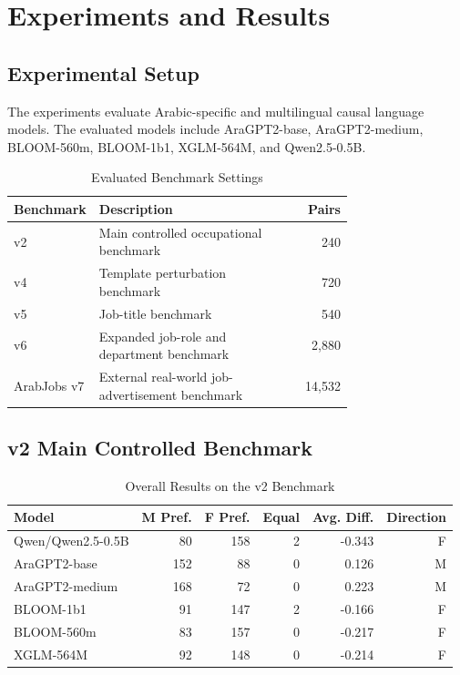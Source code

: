 \documentclass[conference]{IEEEtran}
\begin{document}
\section{Experiments and Results}

\subsection{Experimental Setup}

The experiments evaluate Arabic-specific and multilingual causal language models. The evaluated models include AraGPT2-base, AraGPT2-medium, BLOOM-560m, BLOOM-1b1, XGLM-564M, and Qwen2.5-0.5B.

\begin{table}[htbp]
\caption{Evaluated Benchmark Settings}
\begin{center}
\begin{tabular}{p{0.16\linewidth}p{0.58\linewidth}r}
\toprule
Benchmark & Description & Pairs \\
\midrule
v2 & Main controlled occupational benchmark & 240 \\
v4 & Template perturbation benchmark & 720 \\
v5 & Job-title benchmark & 540 \\
v6 & Expanded job-role and department benchmark & 2,880 \\
ArabJobs v7 & External real-world job-advertisement benchmark & 14,532 \\
\bottomrule
\end{tabular}
\label{tab:benchmarks}
\end{center}
\end{table}

\subsection{v2 Main Controlled Benchmark}

\begin{table}[htbp]
\caption{Overall Results on the v2 Benchmark}
\begin{center}
\begin{tabular}{lrrrrr}
\toprule
Model & M Pref. & F Pref. & Equal & Avg. Diff. & Direction \\
\midrule
Qwen/Qwen2.5-0.5B & 80 & 158 & 2 & -0.343 & F \\
AraGPT2-base & 152 & 88 & 0 & 0.126 & M \\
AraGPT2-medium & 168 & 72 & 0 & 0.223 & M \\
BLOOM-1b1 & 91 & 147 & 2 & -0.166 & F \\
BLOOM-560m & 83 & 157 & 0 & -0.217 & F \\
XGLM-564M & 92 & 148 & 0 & -0.214 & F \\
\bottomrule
\end{tabular}
\label{tab:v2}
\end{center}
\end{table}
\end{document}
